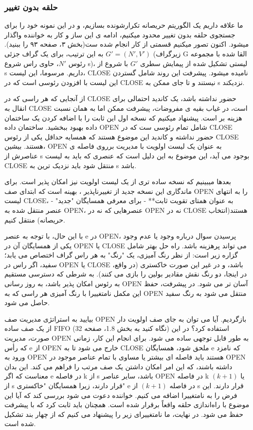 \documentclass{book} %
\begin{document}
\subsubsection*{حلقه بدون تغییر}

ما علاقه داریم یک الگوریتم حریصانه تکرارشونده بسازیم، و در این نمونه خود را برای جستجوی حلقه بدون تغییر محدود میکنیم، ادامه ی این ساز و کار به خواننده واگذار میشود. اکنون تصور میکنیم قسمتی از کار انجام شده ست(بخش ۳، صفحه ۹۳ را ببنید). به این ترتیب، برای یک گراف جزئی $G′ = (N′, V′)$ (زیرگراف G القا شده با مجموعه رئوس $N'$، حاوی راس شروع s)، لیستی تشکیل شده از پیمایش سطری $G'$ با شروع از s داریم.
مرسوما، این لیست، CLOSE نامیده میشود. پیشرفت این روند شامل گستردن این لیست با افزودن رئوسی است که در CLOSE نیستند و تا جای ممکن به s نزدیکند.


از آنجایی که هر راسی که در CLOSE حضور نداشته باشد، یک کاندید احتمالی برای انقال به CLOSE است، در غیاب بقیه ی مفروضات، پیشرفت ممکن اما به همان نسبت هزینه بر است.
پیشنهاد میکنیم که نسخه اول این ثابت را با اضافه کردن یک ساختمان داده بهبود ببخشید. ساختمان داده OPEN شامل تمام رئوسی ست که در CLOSE حضور نداشته و کاندید این موضوع هستند که همسایه حداقل یکی از رئوس CLOSE هستند.
بیشین، OPEN به عنوان یک لیست اولویت با مدیریت برروی فاصله ی عناصرش از ‌s بوجود می آید، این موضوع به این دلیل است که عنصری که باید به لیست CLOSE منتقل شود باید نزدیک ترین به s باشد.


بعدها میبینیم که نسخه ساده تری از یک لیست اولویت نیز امکان پذیر است. برای ماندگاری این نسخه جدید از تغییرناپذیر ، بهینه است که ابتدای صف OPEN را به انتهای لیست CLOSE، - به عنوان همتای تقویت ثابت** - برای معرفی همسایگان "جدید" عنصر منتقل شده به OPEN، عنصرهایی که نه در OPEN نه در CLOSE هستند(انتخاب حریصانه) منتقل کنیم.

با این حال، با توجه به عنصر e در OPEN، پرسیدن سوال درباره وجود یا عدم وجود یکی از همسایگان آن در OPEN یا CLOSE می تواند پرهزینه باشد. راه حل بهتر شامل گزاره زیر است: از نظر رنگ آمیزی، یک "رنگ" به هر راس گراف اختصاص می یابد؛ سفید، اگر راس در OPEN یا CLOSE باشد، و در غیر این صورت خاکستری (در واقع، در اینجا، دو رنگ نقش مقادیر بولین را بازی می کنند). به شرطی که دسترسی مستقیم به رئوس امکان پذیر باشد، به روز رسانی OPEN آسان تر می شود. در پیشرفت، حفظ این مکمل نامتغییرا با رنگ آمیزی هر راسی که به OPEN منتقل می شود به رنگ سفید حاصل می شود.

بیایید به استراتژی مدیریت صف OPEN بازگردیم. آیا می توان به جای صف اولویت دار از یک صف ساده FIFO (نگاه کنید به بخش 1.8، صفحه 32) استفاده کرد؟ در این صورت، مدیریت OPEN به طور قابل توجهی ساده می شود. برای انجام این کار، زمانی که رأس e از OPEN خارج می شود تا به CLOSE ملحق شود، همسایگان e که نامزد ورود به OPEN هستند باید فاصله ای بیشتر یا مساوی با تمام عناصر موجود در OPEN داشته باشند، که این امر امکان داشتن یک صف مرتب را فراهم می کند. این بدان معناست که اگر e در فاصله k از s باشد، سایر عناصر OPEN در فاصله k یا $(k + 1)$ از s قرار دارند، زیرا همسایگان "خاکستری" e در فاصله $(k + 1)$ از s قرار دارند. این فرض را به نامتغییرا اضافه می کنیم. خواننده دعوت می شود بررسی کند که آیا این موضوع با راه‌اندازی حلقه واقعاً برقرار شده است. همچنان باید ثابت کرد که با پیشرفت حفظ می شود. در نهایت، ما نامتغییرای زیر را پیشنهاد می کنیم که از چهار بند تشکیل شده است.
\end{document}
